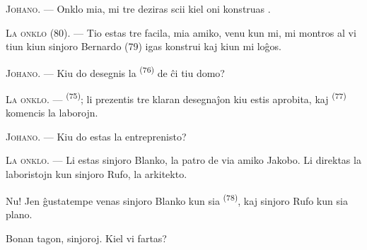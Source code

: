 %
%
%

\VUsaut{6.0mm}
\VUsaut{1.4mm}
\VUsaut{2.2mm}

\VUsaut{3.0mm}

\textsc{Johano}. --- Onklo mia, mi tre deziras scii kiel oni konstruas
.

\textsc{La onklo} (80). --- Tio estas tre facila, mia amiko, venu kun mi, mi
montros al vi tiun kiun sinjoro Bernardo (79) igas konstrui kaj kiun mi loĝos.

\textsc{Johano}. --- Kiu do desegnis la  \textsuperscript{(76)}
de ĉi tiu domo?

\textsc{La onklo}. ---  \textsuperscript{(75)}; li
prezentis tre klaran desegnaĵon kiu estis aprobita, kaj  \textsuperscript{(77)} komencis la laborojn.

\textsc{Johano}. --- Kiu do estas la entreprenisto?

\textsc{La onklo}. --- Li estas sinjoro Blanko, la patro de via amiko Jakobo.
Li direktas la laboristojn kun sinjoro Rufo, la arkitekto.

Nu! Jen ĝustatempe venas sinjoro Blanko kun sia 
\textsuperscript{(78)}, kaj sinjoro Rufo kun sia plano.

Bonan tagon, sinjoroj. Kiel vi fartas?

